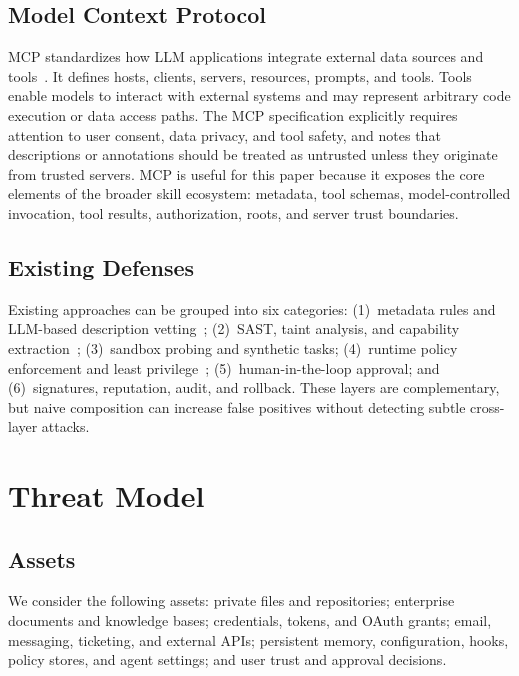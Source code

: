 \documentclass[10pt]{article}
\begin{document}
\subsection{Model Context Protocol}

MCP standardizes how LLM applications integrate external data sources and tools~\cite{mcp_spec_2025,mcp_tools_2025}. It defines hosts, clients, servers, resources, prompts, and tools. Tools enable models to interact with external systems and may represent arbitrary code execution or data access paths. The MCP specification explicitly requires attention to user consent, data privacy, and tool safety, and notes that descriptions or annotations should be treated as untrusted unless they originate from trusted servers. MCP is useful for this paper because it exposes the core elements of the broader skill ecosystem: metadata, tool schemas, model-controlled invocation, tool results, authorization, roots, and server trust boundaries.

\subsection{Existing Defenses}

Existing approaches can be grouped into six categories: (1)~metadata rules and LLM-based description vetting~\cite{wang2026mcptox,ye2026trustdesc,owasp_mcp_tool_poisoning}; (2)~SAST, taint analysis, and capability extraction~\cite{sun2026vipermcp,hou2026mcpbiflow}; (3)~sandbox probing and synthetic tasks; (4)~runtime policy enforcement and least privilege~\cite{zhou2026mcpshield}; (5)~human-in-the-loop approval; and (6)~signatures, reputation, audit, and rollback. These layers are complementary, but naive composition can increase false positives without detecting subtle cross-layer attacks.

\section{Threat Model}
\label{sec:threat}

\subsection{Assets}

We consider the following assets: private files and repositories; enterprise documents and knowledge bases; credentials, tokens, and OAuth grants; email, messaging, ticketing, and external APIs; persistent memory, configuration, hooks, policy stores, and agent settings; and user trust and approval decisions.
\end{document}
